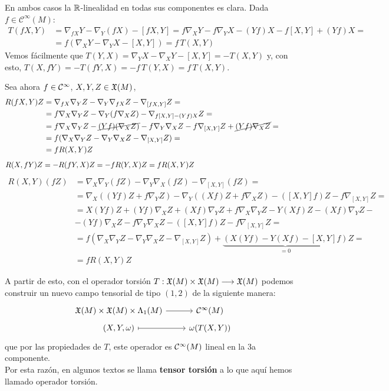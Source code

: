 \begin{dem}
    En ambos casos la $\mathbb{R}$-linealidad en todas sus componentes es clara. Dada $f \in \mathcal{C}^{\infty}(M)$: \[ \begin{split} T(fX,Y) & = \nabla_{fX}Y - \nabla_Y(fX) - [fX,Y] = f\nabla_X Y - f\nabla_Y X - (Yf)X - f[X,Y] + (Yf)X = \\ & = f(\nabla_X Y - \nabla_Y X - [X,Y]) = f\,T(X,Y) \end{split} \]
    Vemos f\'acilmente que $T(Y,X) =\nabla_Y X - \nabla_X Y - [X,Y] = -T(X,Y)$ y, con esto, $T(X,fY) = -T(fY,X) = -f\,T(Y,X) = f\,T(X,Y)$.

    Sea ahora $f\in \mathcal{C}^{\infty}$, $X,Y,Z \in \mathfrak{X}(M)$,
    \[\begin{split}R(fX,Y)Z & =\nabla_{fX}\nabla _Y Z- \nabla_Y \nabla_{fX} Z- \nabla_{[fX,Y]} Z = \\ & = f\nabla_X \nabla_Y Z - \nabla_Y (f\nabla_X Z )- \nabla_{f[X,Y]-(Yf)X} Z =\\ & = f \nabla_X \nabla_Y Z - \cancel{(Yf) (\nabla_X Z)} - f\nabla_Y \nabla_X Z - f \nabla_{[X,Y]} Z + \cancel{(Yf) \nabla_X Z} = \hspace{10mm} \\ & = f (\nabla_X \nabla_Y Z - \nabla_Y \nabla_X Z - \nabla_{[X,Y]} Z) = \\ & = f R(X,Y)Z\end{split}\]
    \[\begin{split}
        R(X,fY)Z = -R(fY,X) Z = -fR(Y,X)Z = fR(X,Y)Z \hspace{50mm}
    \end{split}\]
    \[\begin{split}
        R(X,Y)(fZ) & = \nabla_X \nabla_Y (fZ) - \nabla_Y \nabla_X (fZ) - \nabla_{[X,Y]} (fZ) = \\ & = \nabla_X \left( (Yf)Z+f \nabla_YZ \right) - \nabla_Y \left( (Xf) Z + f \nabla_X Z \right) - \left( [X,Y] f\right)Z - f\nabla_{[X,Y]} Z = \\ & = X(Yf)Z + (Yf) \nabla_XZ + (Xf) \nabla_Y Z + f \nabla_X \nabla_Y Z - Y(Xf) Z - (Xf) \nabla_Y Z - \\ & - (Yf) \nabla_XZ - f \nabla_Y\nabla_X Z - ([X,Y]f)Z-f \nabla_{[X,Y]}Z = \\ & = f(\nabla_X \nabla_Y Z - \nabla_Y \nabla_X Z - \nabla_{[X,Y]} Z) + \underbrace{\left( X(Yf) - Y(Xf) - [X,Y]f\right)}_{=0} Z = \\ & = fR(X,Y)Z 
    \end{split}\]
\end{dem}
A partir de esto, con el operador torsi\'on $T: \mathfrak{X}(M) \times \mathfrak{X}(M) \longrightarrow \mathfrak{X}(M)$ podemos construir un nuevo campo tensorial de tipo $(1,2)$ de la siguiente manera:
$$\bt \X(M)\times \X(M) \times \Lambda_1(M) \rar &  \mc C^{\infty}(M)\\[-5mm]
(X,Y,\omega) \arrow[mapsto]{r}& \omega (T(X,Y))
\et$$
que por las propiedades de $T$, este operador es $\mathcal{C}^{\infty}(M)$ lineal en la 3a componente.\\
Por esta raz\'on, en algunos textos se llama \textbf{tensor torsi\'on} a lo que aqu\'i hemos llamado operador torsi\'on.

